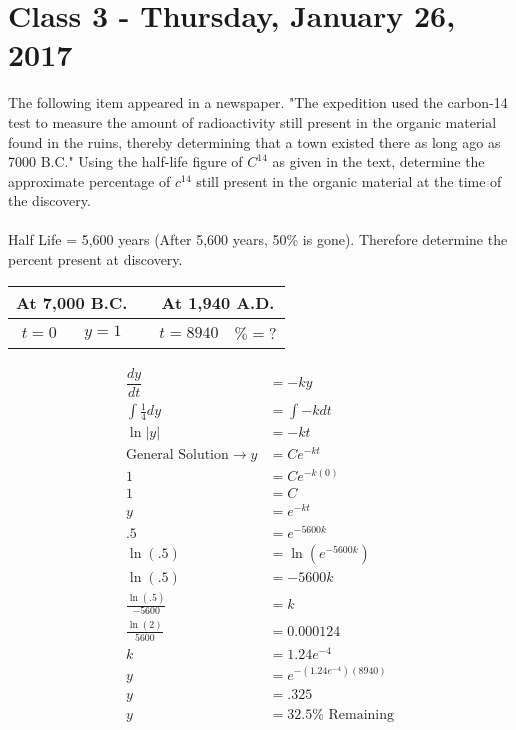 \chapter{Class 3 - Thursday, January 26, 2017}
\begin{hwk}
The following item appeared in a newspaper. "The expedition used the carbon-14 test to measure the amount of radioactivity still present in the organic material found in the ruins, thereby determining that a town existed there as long ago as 7000 B.C." Using the half-life figure of $C^{14}$ as given in the text, determine the approximate percentage of $c^{14}$ still present in the organic material at the time of the discovery.\\\\
Half Life = 5,600 years (After 5,600 years, 50\% is gone). Therefore determine the percent present at discovery.\\
\begin{center}
\begin{tabular}{|c|c|c|c|c|}
\hline
\multicolumn{2}{|c|}{At 7,000 B.C.} &  & \multicolumn{2}{|c|}{At 1,940 A.D.}\\
\hline
$t=0$ & $y=1$ &  & $t=8940$ & $\%=$? \\
\hline
\end{tabular}
\end{center}
\begin{align*}
    \dfrac{dy}{dt}&=-ky\\
    \int \frac{1}{4} dy &= \int -k dt\\
    \ln|y|&=-kt\\
    \text{General Solution} \rightarrow y&=Ce^{-kt}\\
    1&=Ce^{-k(0)}\\
    1&=C\\
    y&=e^{-kt}\\
    .5&=e^{-5600k}\\
    \ln (.5)&=\ln(e^{-5600k})\\
    \ln(.5)&=-5600k\\
    \frac{\ln(.5)}{-5600}&=k\\
    \frac{\ln (2)}{5600}&=0.000124\\
    k&=1.24e^{-4}\\
    y&= e^{-(1.24e^{-4})(8940)}\\
    y&=.325\\
    y&=32.5\% \text{ Remaining}
\end{align*}
\end{hwk}

